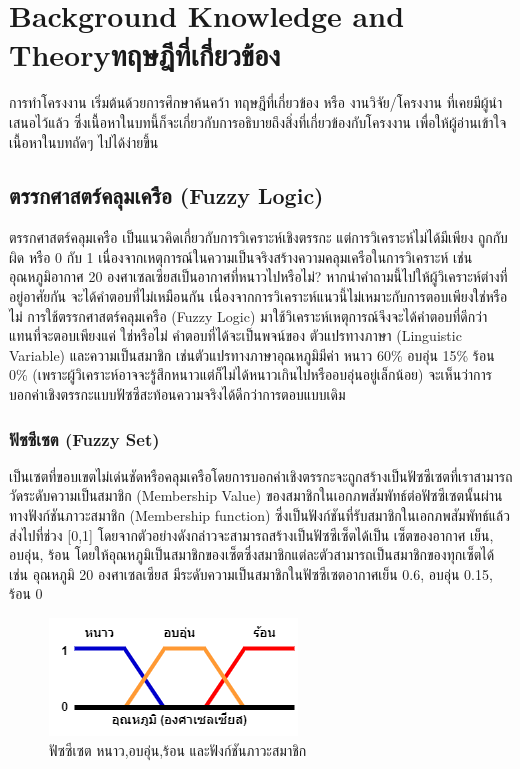 \chapter{\ifenglish Background Knowledge and Theory\else ทฤษฎีที่เกี่ยวข้อง\fi}

การทำโครงงาน เริ่มต้นด้วยการศึกษาค้นคว้า ทฤษฎีที่เกี่ยวข้อง หรือ งานวิจัย/โครงงาน ที่เคยมีผู้นำเสนอไว้แล้ว ซึ่งเนื้อหาในบทนี้ก็จะเกี่ยวกับการอธิบายถึงสิ่งที่เกี่ยวข้องกับโครงงาน เพื่อให้ผู้อ่านเข้าใจเนื้อหาในบทถัดๆ ไปได้ง่ายขึ้น

\section{ตรรกศาสตร์คลุมเครือ (Fuzzy Logic)}
ตรรกศาสตร์คลุมเครือ เป็นแนวคิดเกี่ยวกับการวิเคราะห์เชิงตรรกะ แต่การวิเคราะห์ไม่ได้มีเพียง ถูกกับผิด หรือ 0 กับ 1 เนื่องจากเหตุการณ์ในความเป็นจริงสร้างความคลุมเครือในการวิเคราะห์ เช่น อุณหภูมิอากาศ 20 องศาเซลเซียสเป็นอากาศที่หนาวไปหรือไม่? หากนำคำถามนี้ไปให้ผู้วิเคราะห์ต่างที่อยู่อาศัยกัน จะได้คำตอบที่ไม่เหมือนกัน เนื่องจากการวิเคราะห์แนวนี้ไม่เหมาะกับการตอบเพียงใช่หรือไม่ การใช้ตรรกศาสตร์คลุมเครือ (Fuzzy Logic) มาใช้วิเคราะห์เหตุการณ์จึงจะได้คำตอบที่ดีกว่า แทนที่จะตอบเพียงแค่ ใช่หรือไม่ คำตอบที่ได้จะเป็นพจน์ของ ตัวแปรทางภาษา (Linguistic Variable) และความเป็นสมาชิก เช่นตัวแปรทางภาษาอุณหภูมิมีค่า หนาว 60\% อบอุ่น 15\% ร้อน 0\% (เพราะผู้วิเคราะห์อาจจะรู้สึกหนาวแต่ก็ไม่ได้หนาวเกินไปหรืออบอุ่นอยู่เล็กน้อย) จะเห็นว่าการบอกค่าเชิงตรรกะแบบฟัซซีสะท้อนความจริงได้ดีกว่าการตอบแบบเดิม


\subsection{ฟัซซีเซต (Fuzzy Set)}
เป็นเซตที่ขอบเขตไม่เด่นชัดหรือคลุมเครือโดยการบอกค่าเชิงตรรกะจะถูกสร้างเป็นฟัซซีเซตที่เราสามารถวัดระดับความเป็นสมาชิก (Membership Value) ของสมาชิกในเอกภพสัมพัทธ์ต่อฟัซซีเซตนั้นผ่านทางฟังก์ชันภาวะสมาชิก (Membership function) ซึ่งเป็นฟังก์ชันที่รับสมาชิกในเอกภพสัมพัทธ์แล้วส่งไปที่ช่วง [0,1] โดยจากตัวอย่างดังกล่าวจะสามารถสร้างเป็นฟัซซีเซ็ตได้เป็น เซ็ตของอากาศ เย็น, อบอุ่น, ร้อน โดยให้อุณหภูมิเป็นสมาชิกของเซ็ตซึ่งสมาชิกแต่ละตัวสามารถเป็นสมาชิกของทุกเซ็ตได้ เช่น อุณหภูมิ 20 องศาเซลเซียส มีระดับความเป็นสมาชิกในฟัซซีเซตอากาศเย็น 0.6, อบอุ่น 0.15, ร้อน 0
\begin{figure}[ht]
    \centering
    \includegraphics[scale=0.7]{images/fuzzy_set.png}
    \caption{ฟัซซีเซต หนาว,อบอุ่น,ร้อน และฟังก์ชันภาวะสมาชิก}
    \label{fig:1}
\end{figure}

